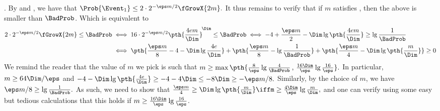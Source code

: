 \begin{proofof} {\textsc{.}}
    By  and , we have that
    \begin{math}
        \Prob{\Event_1} \leq%
        2 \cdot 2^{-\eps m /2} \fGrowX{2m}.
    \end{math}
    It thus remains to verify that if $m$ satisfies ,
    then the above is smaller than $\BadProb$.
    Which is equivalent to
    \begin{align*}
      2 \cdot 2^{-\eps m/2} \fGrowX{2m} \leq \BadProb
      &  \iff
        16 \cdot 2^{-\eps m/2} \pth{\frac{4 e m}{\Dim}}^{\!\Dim}
        \leq \BadProb
      \iff
        -4 + \frac{\eps m }{ 2} - \Dim \lg \pth{\frac{4 e m}{\Dim}}
        \geq \lg \frac{1}{\BadProb}%
      \\%
      &%
        \iff
        \pth{ \frac{ \eps m}{8} -4 - \Dim \lg \frac{4 e}{\Dim}}
        + \pth{ \frac{\eps m}{8} - \lg \frac{1}{\BadProb}}
        + \pth{\frac{\eps m }{ 4} - \Dim \lg \pth{\frac{ m}{\Dim}}}
        \geq 0%
    \end{align*}
    We remind the reader that the value of $m$ we pick is such that 
    \begin{math}
        m \geq \max\pth{ \frac{8}{\eps} \lg \frac{4}{\BadProb} \,,\,
           \frac{16\Dim}{\eps}\lg \frac{16}{\eps} }.
    \end{math}
    In particular, $m \geq 64 \Dim / \eps$
    and
    \begin{math}
        -4 - \Dim \lg \pth{\frac{4 e }{\Dim}} \geq -4 - 4 \Dim \leq -8
        \Dim \geq -\eps m /8.
    \end{math} 
    Similarly, by the choice of $m$, we have
    \begin{math}
        \eps m /8 \geq \lg \frac{1}{\BadProb}. 
    \end{math}
    As such, we need to show that
    \begin{math}
        \frac{\eps m }{ 4} \geq \Dim \lg \pth{\frac{ m}{\Dim}} \iff%
        m \geq \frac{4\Dim}{\eps} \lg {\frac{ m}{\Dim}},
    \end{math}
    and one can verify using some easy but tedious calculations that
    this holds if $ m \geq \frac{16\Dim}{\eps}\lg \frac{16}{\eps} $.
%    
\end{proofof}







